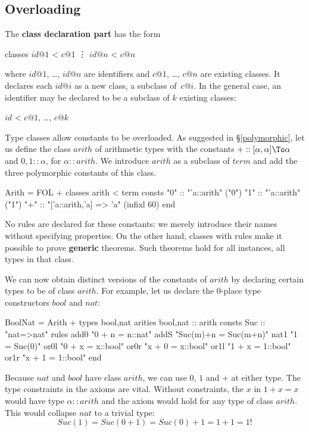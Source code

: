 \subsection{Overloading}
The {\bf class declaration part} has the form
\begin{ttbox}
classes \(id@1\) < \(c@1\)
        \vdots
        \(id@n\) < \(c@n\)
\end{ttbox}
where $id@1$, \ldots, $id@n$ are identifiers and $c@1$, \ldots, $c@n$ are
existing classes.  It declares each $id@i$ as a new class, a subclass
of~$c@i$.  In the general case, an identifier may be declared to be a
subclass of $k$ existing classes:
\begin{ttbox}
        \(id\) < \(c@1\), \ldots, \(c@k\)
\end{ttbox}
Type classes allow constants to be overloaded.  As suggested in
\S\ref{polymorphic}, let us define the class $arith$ of arithmetic
types with the constants ${+} :: [\alpha,\alpha]\To \alpha$ and $0,1 {::}
\alpha$, for $\alpha{::}arith$.  We introduce $arith$ as a subclass of
$term$ and add the three polymorphic constants of this class.
\begin{ttbox}
Arith = FOL +
classes arith < term
consts  "0"     :: "'a::arith"                  ("0")
        "1"     :: "'a::arith"                  ("1")
        "+"     :: "['a::arith,'a] => 'a"       (infixl 60)
end
\end{ttbox}
No rules are declared for these constants: we merely introduce their
names without specifying properties.  On the other hand, classes
with rules make it possible to prove {\bf generic} theorems.  Such
theorems hold for all instances, all types in that class.

We can now obtain distinct versions of the constants of $arith$ by
declaring certain types to be of class $arith$.  For example, let us
declare the 0-place type constructors $bool$ and $nat$:
\begin{ttbox}
BoolNat = Arith +
types   bool,nat
arities bool,nat    :: arith
consts  Suc         :: "nat=>nat"
\ttbreak
rules   add0        "0 + n = n::nat"
        addS        "Suc(m)+n = Suc(m+n)"
        nat1        "1 = Suc(0)"
        or0l        "0 + x = x::bool"
        or0r        "x + 0 = x::bool"
        or1l        "1 + x = 1::bool"
        or1r        "x + 1 = 1::bool"
end
\end{ttbox}
Because $nat$ and $bool$ have class $arith$, we can use $0$, $1$ and $+$ at
either type.  The type constraints in the axioms are vital.  Without
constraints, the $x$ in $1+x = x$ would have type $\alpha{::}arith$
and the axiom would hold for any type of class $arith$.  This would
collapse $nat$ to a trivial type:
\[ Suc(1) = Suc(0+1) = Suc(0)+1 = 1+1 = 1! \]



